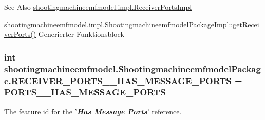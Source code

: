 \begin{DoxySeeAlso}{See Also}
\hyperlink{classshootingmachineemfmodel_1_1impl_1_1_receiver_ports_impl}{shootingmachineemfmodel.\-impl.\-Receiver\-Ports\-Impl} 

\hyperlink{classshootingmachineemfmodel_1_1impl_1_1_shootingmachineemfmodel_package_impl_a821826b4a77ddfe1d4366780aeef3b9c}{shootingmachineemfmodel.\-impl.\-Shootingmachineemfmodel\-Package\-Impl\-::get\-Receiver\-Ports()} Generierter Funktionsblock 
\end{DoxySeeAlso}
\hypertarget{interfaceshootingmachineemfmodel_1_1_shootingmachineemfmodel_package_a7c53dc7a94983b99dae80e1d58d045c9}{
\subsubsection[{R\-E\-C\-E\-I\-V\-E\-R\-\_\-\-P\-O\-R\-T\-S\-\_\-\-\_\-\-H\-A\-S\-\_\-\-M\-E\-S\-S\-A\-G\-E\-\_\-\-P\-O\-R\-T\-S}]{\setlength{\rightskip}{0pt plus 5cm}int shootingmachineemfmodel.\-Shootingmachineemfmodel\-Package.\-R\-E\-C\-E\-I\-V\-E\-R\-\_\-\-P\-O\-R\-T\-S\-\_\-\-\_\-\-H\-A\-S\-\_\-\-M\-E\-S\-S\-A\-G\-E\-\_\-\-P\-O\-R\-T\-S = {\bf P\-O\-R\-T\-S\-\_\-\-\_\-\-H\-A\-S\-\_\-\-M\-E\-S\-S\-A\-G\-E\-\_\-\-P\-O\-R\-T\-S}}}\label{interfaceshootingmachineemfmodel_1_1_shootingmachineemfmodel_package_a7c53dc7a94983b99dae80e1d58d045c9}
The feature id for the '{\itshape {\bfseries Has \hyperlink{interfaceshootingmachineemfmodel_1_1_message}{Message} \hyperlink{interfaceshootingmachineemfmodel_1_1_ports}{Ports}}}' reference.

